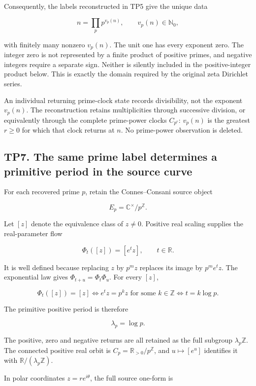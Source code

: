 \documentclass[
]{article}
\begin{document}
Consequently, the labels reconstructed in TP5 give the unique data

\[
n=\prod_p p^{v_p(n)},\qquad
v_p(n)\in\mathbb N_0,
\]

with finitely many nonzero \(v_p(n)\). The unit one has every exponent
zero. The integer zero is not represented by a finite product of
positive primes, and negative integers require a separate sign. Neither
is silently included in the positive-integer product below. This is
exactly the domain required by the original zeta Dirichlet series.

An individual returning prime-clock state records divisibility, not the
exponent \(v_p(n)\). The reconstruction retains multiplicities through
successive division, or equivalently through the complete prime-power
clocks \(C_{p^r}\): \(v_p(n)\) is the greatest \(r\ge0\) for which that
clock returns at \(n\). No prime-power observation is deleted.

\subsection{TP7. The same prime label determines a primitive period in
the source
curve}\label{tp7.-the-same-prime-label-determines-a-primitive-period-in-the-source-curve}

For each recovered prime \(p\), retain the Connes--Consani source object

\[
E_p=\mathbb C^\times/p^{\mathbb Z}.
\]

Let \([z]\) denote the equivalence class of \(z\ne0\). Positive real
scaling supplies the real-parameter flow

\[
\Phi_t([z])=[e^t z],\qquad t\in\mathbb R.
\]

It is well defined because replacing \(z\) by \(p^m z\) replaces its
image by \(p^m e^t z\). The exponential law gives
\(\Phi_{t+u}=\Phi_t\Phi_u\). For every \([z]\),

\[
\Phi_t([z])=[z]
\iff e^t z=p^kz\text{ for some }k\in\mathbb Z
\iff t=k\log p.
\]

The primitive positive period is therefore

\[
\lambda_p=\log p.
\]

The positive, zero and negative returns are all retained as the full
subgroup \(\lambda_p\mathbb Z\). The connected positive real orbit is
\(C_p=\mathbb R_{>0}/p^{\mathbb Z}\), and \(u\mapsto[e^u]\) identifies
it with \(\mathbb R/(\lambda_p\mathbb Z)\).

In polar coordinates \(z=r e^{i\theta}\), the full source one-form is
\end{document}
